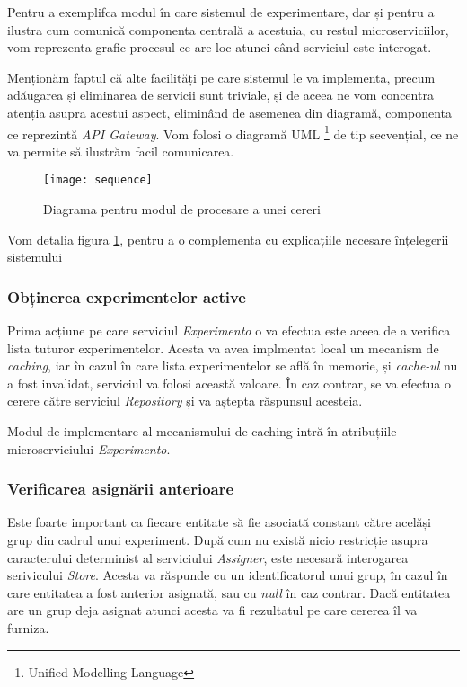 Pentru a exemplifca modul în care sistemul de experimentare, dar și pentru a ilustra cum comunică componenta centrală a acestuia, cu restul microserviciilor, vom reprezenta grafic procesul ce are loc atunci când serviciul este interogat. 

Menționăm faptul că alte facilități pe care sistemul le va implementa, precum adăugarea și eliminarea de servicii sunt triviale, și de aceea ne vom concentra atenția asupra acestui aspect, eliminând de asemenea din diagramă, componenta ce reprezintă \textit{API Gateway}. Vom folosi o diagramă UML \footnote{Unified Modelling Language} de tip secvențial, ce ne va permite să ilustrăm facil comunicarea. 

\begin{figure}[H]
	\centering
	\texttt{[image: sequence]}
	\caption{Diagrama pentru modul de procesare a unei cereri}
	\label{fig:sequence}
\end{figure}

Vom detalia figura \ref{fig:sequence}, pentru a o complementa cu explicațiile necesare înțelegerii sistemului

\subsubsection{Obținerea experimentelor active}
Prima acțiune pe care serviciul \textit{Experimento} o va efectua este aceea de a verifica lista tuturor experimentelor. Acesta va avea implmentat local un mecanism de \textit{caching}, iar în cazul în care lista experimentelor se află în memorie, și \textit{cache-ul} nu a fost invalidat, serviciul va folosi această valoare. În caz contrar, se va efectua o cerere către serviciul \textit{Repository} și va aștepta răspunsul acesteia. 

\begin{remark}
	Modul de implementare al mecanismului de caching intră în atribuțiile microserviciului \textit{Experimento}.
\end{remark} 

\subsubsection{Verificarea asignării anterioare}

Este foarte important ca fiecare entitate să fie asociată constant către acelăși grup din cadrul unui experiment. După cum nu există nicio restricție asupra caracterului determinist al serviciului \textit{Assigner}, este necesară interogarea serivicului \textit{Store}. Acesta va răspunde cu un identificatorul unui grup, în cazul în care entitatea a fost anterior asignată, sau cu \textit{null} în caz contrar. 
Dacă entitatea are un grup deja asignat atunci acesta va fi rezultatul pe care cererea îl va furniza. 

